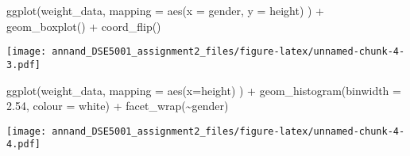 \documentclass[
]{article}
\newenvironment{Shaded}{\begin{snugshade}}{\end{snugshade}}
\newcommand{\AttributeTok}[1]{\textcolor[rgb]{0.77,0.63,0.00}{#1}}
\newcommand{\FloatTok}[1]{\textcolor[rgb]{0.00,0.00,0.81}{#1}}
\newcommand{\FunctionTok}[1]{\textcolor[rgb]{0.00,0.00,0.00}{#1}}
\newcommand{\NormalTok}[1]{#1}
\newcommand{\SpecialCharTok}[1]{\textcolor[rgb]{0.00,0.00,0.00}{#1}}
\newcommand{\StringTok}[1]{\textcolor[rgb]{0.31,0.60,0.02}{#1}}
\begin{document}
\begin{Shaded}
\begin{Highlighting}[]
\FunctionTok{ggplot}\NormalTok{(weight\_data,}
       \AttributeTok{mapping =} \FunctionTok{aes}\NormalTok{(}\AttributeTok{x =}\NormalTok{ gender, }\AttributeTok{y =}\NormalTok{ height)}
\NormalTok{) }\SpecialCharTok{+} \FunctionTok{geom\_boxplot}\NormalTok{() }\SpecialCharTok{+} \FunctionTok{coord\_flip}\NormalTok{()}
\end{Highlighting}
\end{Shaded}

\texttt{[image: annand\_DSE5001\_assignment2\_files/figure-latex/unnamed-chunk-4-3.pdf]}

\begin{Shaded}
\begin{Highlighting}[]
\FunctionTok{ggplot}\NormalTok{(weight\_data,}
       \AttributeTok{mapping =} \FunctionTok{aes}\NormalTok{(}\AttributeTok{x=}\NormalTok{height)}
\NormalTok{) }\SpecialCharTok{+} \FunctionTok{geom\_histogram}\NormalTok{(}\AttributeTok{binwidth =} \FloatTok{2.54}\NormalTok{, }\AttributeTok{colour =} \StringTok{\textquotesingle{}white\textquotesingle{}}\NormalTok{) }\SpecialCharTok{+} \FunctionTok{facet\_wrap}\NormalTok{(}\SpecialCharTok{\textasciitilde{}}\NormalTok{gender)}
\end{Highlighting}
\end{Shaded}

\texttt{[image: annand\_DSE5001\_assignment2\_files/figure-latex/unnamed-chunk-4-4.pdf]}
\end{document}
